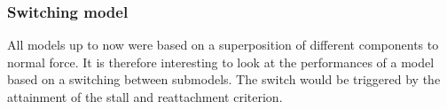 
\subsubsection{Switching model}

All models up to now were based on a superposition of different components to normal force. It is therefore interesting to look at the performances of a model based on a switching between submodels. The switch would be triggered by the attainment of the stall and reattachment criterion.